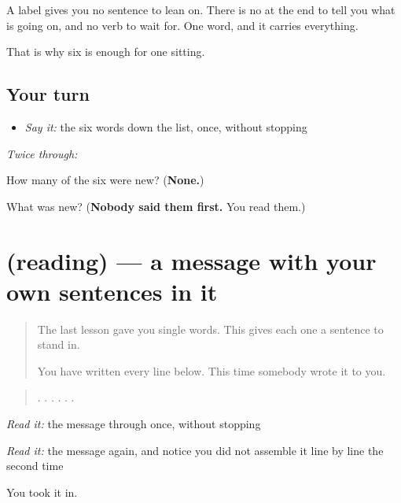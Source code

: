 A label gives you no sentence to lean on. There is no \textbf{} at the end to tell you what is going on, and no verb to wait for. One word, and it carries everything.

That is why six is enough for one sitting.

\subsection*{Your turn}
\begin{itemize}
\raggedright
  \item \emph{Say it:} the six words down the list, once, without stopping
\end{itemize}

\emph{Twice through:}

\begin{tcolorbox}[breakable,colback=teal!4,colframe=teal!35!black,title={Before you move on}]
How many of the six were new? (\textbf{None.})

What was new? (\textbf{Nobody said them first.} You read them.)
\end{tcolorbox}
\section[(reading)]{(reading) — a message with your own sentences in it}

\label{lesson:MR-C62-message}



\begin{quote}
The last lesson gave you single words. This gives each one a sentence to stand in.

You have written every line below. This time somebody wrote it to you.
\end{quote}

\begin{tcolorbox}[breakable,skin=enhanced,colback=orange!6,colframe=orange!45!black,boxrule=0.5pt,arc=1mm,left=6pt,right=6pt,top=4pt,bottom=4pt,fonttitle=\bfseries,title={Read this}]
\begin{quote}
 .    .   .   .   . .
\end{quote}

\emph{Read it:} the message through once, without stopping

\emph{Read it:} the message again, and notice you did not assemble it line by line the second time

You took it in.
\end{tcolorbox}

